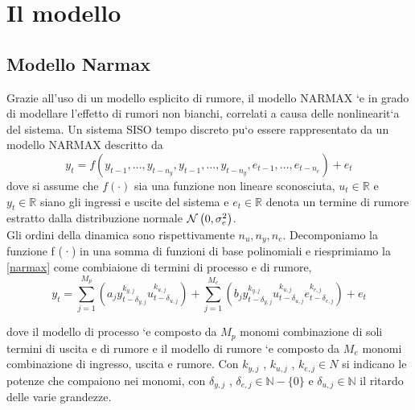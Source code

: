 \chapter{Il modello}
\section{Modello Narmax}
Grazie all’uso di un modello esplicito di rumore, il modello NARMAX `e in grado
di modellare l’effetto di rumori non bianchi, correlati a causa delle nonlinearit`a del
sistema.
Un sistema SISO tempo discreto pu`o essere rappresentato da un modello NARMAX
descritto da
\begin{equation}
y_t=f(y_{t-1},\dots, y_{t-n_y},y_{t-1},\dots, y_{t-n_y},e_{t-1},\dots, e_{t-n_e})+e_t
\label{narmax}
\end{equation}
dove si assume che $f(\cdot)$ sia una funzione non lineare sconosciuta, $u_t\in\mathbb{R}$ e $y_t\in\mathbb{R}$ siano gli ingressi e uscite del sistema e $e_t\in\mathbb{R}$ denota un termine di rumore estratto dalla distribuzione normale $\mathcal{N}\left(0,\sigma_e^2\right)$.\\
Gli ordini della dinamica sono rispettivamente $n_u,n_y,n_e$.
Decomponiamo la funzione f (·) in una somma di funzioni di base polinomiali e
riesprimiamo la \ref{narmax} come combiaione di termini di processo e di rumore,
\begin{equation}
y_t=\sum_{j=1}^{M_p}\left(a_j y_{t-	\delta_{y,j}}^{k_{y,j}} u_{t-	\delta_{u,j}}^{k_{u,j}}\right)+
\sum_{j=1}^{M_e}\left(b_j y_{t-	\delta_{y,j}}^{k_{y,j}} u_{t-	\delta_{u,j}}^{k_{u,j}}
e_{t-	\delta_{e,j}}^{k_{e,j}}\right)+e_t
\end{equation}

dove il modello di processo `e composto da $M_p$ monomi combinazione di soli termini
di uscita e di rumore e il modello di rumore `e composto da $M_e$ monomi combinazione
di ingresso, uscita e rumore. Con $k_{y,j}$ , $k_{u,j}$ , $k_{e,j}\in N$ si indicano le potenze che compaiono nei monomi, con $\delta_{ y,j}$ , $\delta_{ e,j}\in \mathbb{N}-\{0\}$ e
$\delta_{ u,j}\in \mathbb{N}$ il ritardo delle varie grandezze.

